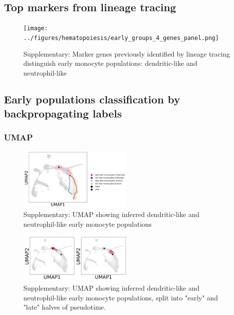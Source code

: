 \documentclass[a4paper]{article}
\begin{document}
\subsection{Top markers from lineage tracing}
\begin{figure}[!htb]
  \centering
  \texttt{[image: ../figures/hematopoiesis/early\_groups\_4\_genes\_panel.png]}
  \caption{Supplementary: Marker genes previously identified by lineage tracing distinguish early monocyte populations: dendritic-like and neutrophil-like}
\end{figure}

\FloatBarrier
\subsection{Early populations classification by backpropagating labels}

\subsubsection{UMAP}
\begin{figure}[!htb]
  \centering
  \includegraphics[width=0.5\textwidth]{../figures/hematopoiesis/early_groups_umap.png}
  \caption{Supplementary: UMAP showing inferred dendritic-like and neutrophil-like early monocyte populations }
\end{figure}

\begin{figure}[!htb]
  \centering
  \includegraphics[width=0.5\textwidth]{../figures/hematopoiesis/early_groups_umap_split.png}
  \caption{Supplementary: UMAP showing inferred dendritic-like and neutrophil-like early monocyte populations, split into "early" and "late" halves of pseudotime. }
\end{figure}

\FloatBarrier
\end{document}
